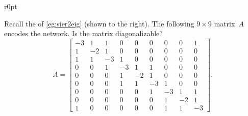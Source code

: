 \begin{wrapfigure}[5]r{0pt}
\end{wrapfigure}
\begin{example} \label{eg:sier2eigp}
Recall the  of \cref{eg:sier2eig} (shown to the right).
The following \(9\times9\) matrix~\(A\) encodes the network.  
Is the matrix diagonalizable?
\begin{equation*}
A=\begin{bmatrix}-3&1&1&0&0&0&0&0&1
\\1&-2&1&0&0&0&0&0&0
\\1&1&-3&1&0&0&0&0&0
\\0&0&1&-3&1&1&0&0&0
\\0&0&0&1&-2&1&0&0&0
\\0&0&0&1&1&-3&1&0&0
\\0&0&0&0&0&1&-3&1&1
\\0&0&0&0&0&0&1&-2&1
\\1&0&0&0&0&0&1&1&-3 \end{bmatrix}.
\end{equation*}


\end{example}
